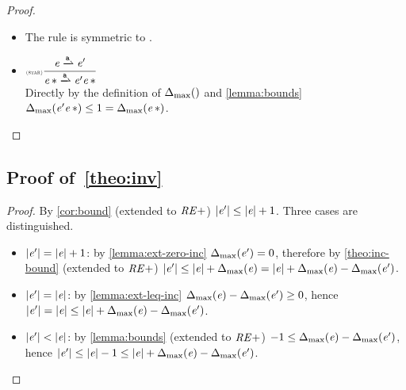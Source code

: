 \begin{proof}
\begin{description}
\begin{itemize}
    \item The rule  is symmetric to .
    \item $\Rule{star}{\re\parDer{\sym}\re'}{\starop{\re}\parDer{\sym}\re'\catop\starop{\re}}{}$\\[2ex]
          Directly by the definition of ${\Delta_{\max}}({})$ and \cref{lemma:bounds}
          ${\Delta_{\max}}({\mathit {e}'{{\mathit {e}}\mathop{*}}})\leq 1={\Delta_{\max}}({{{\mathit {e}}\mathop{*}}})$.
   \end{itemize}
 \end{description}
\end{proof}

\subsection*{Proof of~\cref{theo:inv}}

\begin{proof}
 By \cref{cor:bound} (extended to $\mathit {RE+}$) ${\mid}{\mathit {e}'}{\mid}\leq{\mid}{\ensuremath{\mathit {e}}}{\mid}+ 1$.
 Three cases are distinguished.
 \begin{itemize}
  \item ${\mid}{\mathit {e}'}{\mid}={\mid}{\mathit {e}}{\mid}+1$: by \cref{lemma:ext-zero-inc}
        ${\Delta_{\max}}({\mathit {e}'})=0$, therefore by \cref{theo:inc-bound} (extended to $\mathit {RE+}$) ${\mid}{\mathit {e}'}{\mid}\leq{\mid}{\ensuremath{\mathit {e}}}{\mid}+{\Delta_{\max}}({\mathit {e}})={\mid}{\mathit {e}}{\mid}+{\Delta_{\max}}({\mathit {e}})-{\Delta_{\max}}({\mathit {e}'})$.
  \item ${\mid}{\mathit {e}'}{\mid}={\mid}{\mathit {e}}{\mid}$: by \cref{lemma:ext-leq-inc} ${\Delta_{\max}}({\mathit {e}})-{\Delta_{\max}}({\mathit {e}'})\geq 0$, hence
        ${\mid}{\mathit {e}'}{\mid}={\mid}{\mathit {e}}{\mid}\leq{\mid}{\ensuremath{\mathit {e}}}{\mid}+{\Delta_{\max}}({\mathit {e}})-{\Delta_{\max}}({\mathit {e}'})$.
  \item ${\mid}{\mathit {e}'}{\mid}<{\mid}{\mathit {e}}{\mid}$: by \cref{lemma:bounds} (extended to $\mathit {RE+}$) $-1\leq{\Delta_{\max}}({\mathit {e}})-{\Delta_{\max}}({\mathit {e}'})$, hence
        ${\mid}{\mathit {e}'}{\mid}\leq{\mid}{\ensuremath{\mathit {e}}}{\mid}-1\leq{\mid}{\ensuremath{\mathit {e}}}{\mid}+{\Delta_{\max}}({\mathit {e}})-{\Delta_{\max}}({\mathit {e}'})$.
 \end{itemize}
\end{proof}